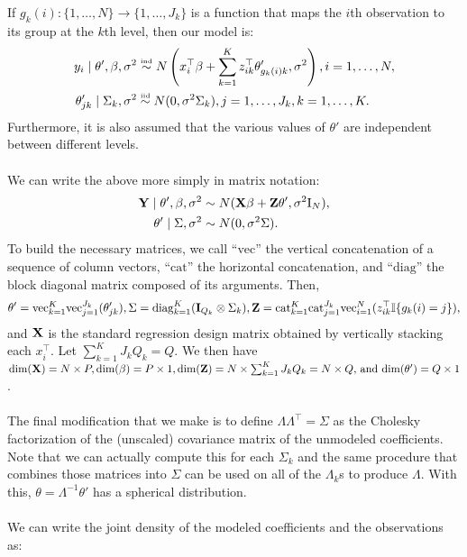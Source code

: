 \documentclass[10pt]{article}
\begin{document}
If \(g_k(i) : \{1,\ldots,N\} \rightarrow \{1,\ldots,J_k\}\) is a
function that maps the $i$th observation to its group at the $k$th
level, then our model is:
\begin{align*}
y_i \mid \theta', \beta, \sigma^2 & \overset{\text{\tiny ind}}{\sim}
N\left(x_i^\top\beta + \sum_{k=1}^K z_{ik}^\top\theta_{g_k(i)k}', \sigma^2\right), i=1,\ldots,N, \\
\theta_{jk}' \mid \Sigma_k, \sigma^2 & \overset{\text{\tiny iid}}{\sim}
N(0, \sigma^2\Sigma_k), j=1,\ldots,J_k, k=1,\ldots,K.
\end{align*}
Furthermore, it is also assumed that the various values of $\theta'$
are independent between different levels. \\ \\
We can write the above more simply in matrix notation:
\begin{align*}
{\bf Y} \mid \theta', \beta, \sigma^2 & \sim
N({\bf X}\beta + {\bf Z}\theta', \sigma^2 \mathrm{I}_N), \\
\theta' \mid \Sigma, \sigma^2 & \sim N(0, \sigma^2 \Sigma).
\end{align*} 
To build the necessary matrices, we call ``\(\mathrm{vec}\)'' the vertical concatenation of a sequence of
column vectors, ``\(\mathrm{cat}\)'' the horizontal
concatenation, and ``\(\mathrm{diag}\)'' the block diagonal matrix
composed of its arguments. Then,
\begin{equation*}
\theta' = \mathrm{vec}_{k=1}^K\mathrm{vec}_{j=1}^{J_k}(\theta_{jk}'),
\Sigma=\mathrm{diag}_{k=1}^K({\bf I}_{Q_k} \otimes \Sigma_k),
{\bf Z}=\mathrm{cat}_{k=1}^K\mathrm{cat}_{j=1}^{J_k}\mathrm{vec}_{i=1}^N
(z_{ik}^\top\mathbb{I}\{g_k(i)=j\}),
\end{equation*}
and ${\bf X}$ is the standard regression design matrix obtained by
vertically stacking each $x_i^\top$. Let $\sum_{k=1}^K J_k Q_k =
Q$. We then have
$\mathrm{dim}({\bf X}) = N\times P,
\mathrm{dim}(\beta) = P \times 1,
\mathrm{dim}({\bf Z})=N\times\sum_{k=1}^K J_k Q_k = N \times Q,\) and \(
\mathrm{dim}(\theta') = Q \times 1$. \\ \\
The final modification that we make is to define $\Lambda\Lambda^\top
= \Sigma$ as the Cholesky factorization of the (unscaled) covariance matrix of the
unmodeled coefficients. Note that we can actually compute this for
each $\Sigma_k$ and the same procedure that combines those matrices
into $\Sigma$ can be used on all of the $\Lambda_k$s to produce
$\Lambda$. With this, $\theta=\Lambda^{-1}\theta'$ has a spherical
distribution. \\ \\
We can write the joint density of the modeled coefficients and the
observations as:
\end{document}
